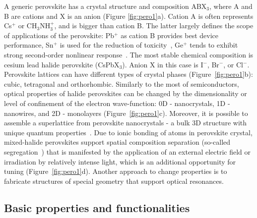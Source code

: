 \documentclass[journal=chreay,manuscript=review]{achemso}
\begin{document}
A generic perovskite has a crystal structure and composition ABX$_3$, where A and B are cations and X is an anion (Figure \ref{fig:pero1}a). Cation A is often represents Cs$^+$ or CH$_3$NH$_3^+$, and is bigger than cation B. The latter largely defines the scope of applications of the perovskite: Pb$^+$ as cation B provides best device performance, Sn$^+$ is used for the reduction of  toxicity~\cite{xiao2019lead}, Ge$^+$ tends to exhibit strong second-order nonlinear response~\cite{stoumpos2015hybrid}. The most stable chemical composition is cesium lead halide perovskite (CsPbX$_3$). Anion X in this case is I$^-$, Br$^-$, or Cl$^-$. Perovskite lattices can have different types of crystal phases (Figure~\ref{fig:pero1}b): cubic, tetragonal and orthorhombic. Similarly to the most of semiconductors, optical properties of halide perovskites can be changed by the dimensionality or level of confinement of the electron wave-function: 0D - nanocrystals, 1D - nanowires, and 2D - monolayers (Figure~\ref{fig:pero1}c). Moreover, it is possible to assemble a superlattice from perovskite nanocrystals - a bulk 3D structure with unique quantum properties~\cite{raino2018superfluorescence}.
Due to ionic bonding of atoms in perovskite crystal, mixed-halide perovskites support spatial composition separation (so-called segregation~\cite{hoke2015reversible}) that is manifested by the application of an external electric field or irradiation by relatively intense light, which is an additional opportunity for tuning (Figure~\ref{fig:pero1}d).
Another approach to change properties is to fabricate structures of special geometry that support optical resonances.

\subsection{Basic properties and functionalities}
\end{document}
